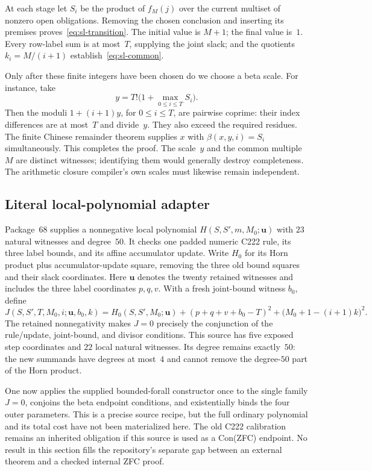 At each stage let $S_i$ be the product of $f_M(j)$ over the current multiset
of nonzero open obligations.  Removing the chosen conclusion and inserting
its premises proves~\eqref{eq:sl-transition}.  The initial value is $M+1$;
the final value is~$1$.  Every row-label sum is at most~$T$, supplying the joint slack; and the quotients
$k_i=M/(i+1)$ establish~\eqref{eq:sl-common}.

Only after these finite integers have been chosen do we choose a beta scale.
For instance, take
\[
 y=T!\bigl(1+\max_{0\leq i\leq T}S_i\bigr).
\]
Then the moduli $1+(i+1)y$, for $0\leq i\leq T$, are pairwise coprime:
their index differences are at most~$T$ and divide~$y$.  They also exceed
the required residues.  The finite Chinese remainder theorem supplies
$x$ with $\beta(x,y,i)=S_i$ simultaneously.  This completes the proof.
The scale~$y$ and the common multiple~$M$ are distinct witnesses; identifying
them would generally destroy completeness.  The arithmetic closure
compiler's own scales must likewise remain independent.

\subsection{Literal local-polynomial adapter}

Package~68 supplies a nonnegative local polynomial
$H(S,S',m,M_0;\mathbf u)$ with $23$ natural witnesses and degree~$50$.
It checks one padded numeric C222 rule, its three label bounds, and its
affine accumulator update.  Write $H_0$ for its Horn product plus accumulator-update square, removing
the three old bound squares and their slack coordinates.  Here $\mathbf u$
denotes the twenty retained witnesses and includes the three label coordinates
$p,q,v$.  With a fresh joint-bound witness $b_0$, define
\[
 J(S,S',T,M_0,i;\mathbf u,b_0,k)
 =H_0(S,S',M_0;\mathbf u)
  + (p+q+v+b_0-T)^2 +\bigl(M_0+1-(i+1)k\bigr)^2.
\]
The retained nonnegativity makes $J=0$ precisely the conjunction of the rule/update, joint-bound, and divisor
conditions.  This source has five exposed step coordinates and $22$ local
natural witnesses.  Its degree remains exactly~$50$: the new summands
have degrees at most~$4$ and cannot remove the degree-$50$ part of the Horn product.

One now applies the supplied bounded-forall constructor once to the single
family $J=0$, conjoins the beta endpoint conditions, and existentially binds
the four outer parameters.  This is a precise source recipe, but the full
ordinary polynomial and its total cost have not been materialized here.
The old C222 calibration remains an inherited obligation if this source is
used as a Con(ZFC) endpoint.  No result in this section fills the repository's
separate gap between an external theorem and a checked internal ZFC proof.


